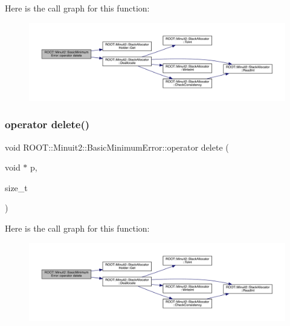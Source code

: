 Here is the call graph for this function\+:
\nopagebreak
\begin{figure}[H]
\begin{center}
\leavevmode
\includegraphics[width=350pt]{d9/ddd/classROOT_1_1Minuit2_1_1BasicMinimumError_ae64544fb94b090a6a9117243c5fa9f93_cgraph}
\end{center}
\end{figure}
\mbox{\label{classROOT_1_1Minuit2_1_1BasicMinimumError_ae64544fb94b090a6a9117243c5fa9f93}} 
\subsubsection{\texorpdfstring{operator delete()}{operator delete()}\hspace{0.1cm}{\footnotesize\ttfamily [2/2]}}
{\footnotesize\ttfamily void R\+O\+O\+T\+::\+Minuit2\+::\+Basic\+Minimum\+Error\+::operator delete (\begin{DoxyParamCaption}\item[{void $\ast$}]{p,  }\item[{size\+\_\+t}]{ }\end{DoxyParamCaption})\hspace{0.3cm}{\ttfamily [inline]}}

Here is the call graph for this function\+:
\nopagebreak
\begin{figure}[H]
\begin{center}
\leavevmode
\includegraphics[width=350pt]{d9/ddd/classROOT_1_1Minuit2_1_1BasicMinimumError_ae64544fb94b090a6a9117243c5fa9f93_cgraph}
\end{center}
\end{figure}
\mbox{\label{classROOT_1_1Minuit2_1_1BasicMinimumError_a722b14848c4cb4144f4ba7cdf90e5ef3}} 
